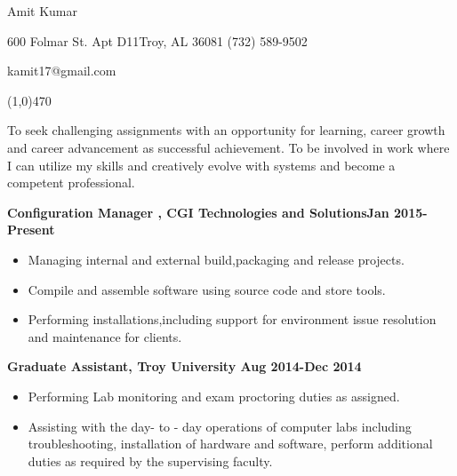 \documentclass[10.5pt]{article} %
\begin{document}


\centerline{{\Large \sc Amit Kumar}}  %
\centerline{600 Folmar St. Apt D11\textbullet \hspace{5pt}Troy, AL 36081 \textbullet \hspace{5pt} (732) 589-9502}
\centerline{kamit17@gmail.com}
\noindent
\line(1,0){470}\\

\smallskip
\noindent

To seek challenging assignments with an opportunity for learning, career growth and career advancement as successful achievement.
To be involved in work where I can utilize my skills and creatively evolve with systems and become a competent professional.\medskip

\smallskip %

 \medskip

\noindent \centerline{\large \bf Configuration Manager , CGI Technologies and Solutions\hfill Jan 2015-Present}
\begin{itemize}
  \item Managing internal and external build,packaging and release projects.
  \item Compile and assemble software using source code and store tools.
   \item Performing installations,including support  for environment issue resolution and maintenance for clients.
\end{itemize}

\smallskip

\noindent \centerline{\large \bf Graduate Assistant, Troy University \hfill Aug 2014-Dec 2014}
\begin{itemize}
  \item Performing Lab monitoring and exam proctoring duties as assigned.
  \item Assisting with the day- to - day operations of computer labs including troubleshooting, installation of hardware and software, perform additional duties as required by the supervising faculty.
\end{itemize}
\end{document}
